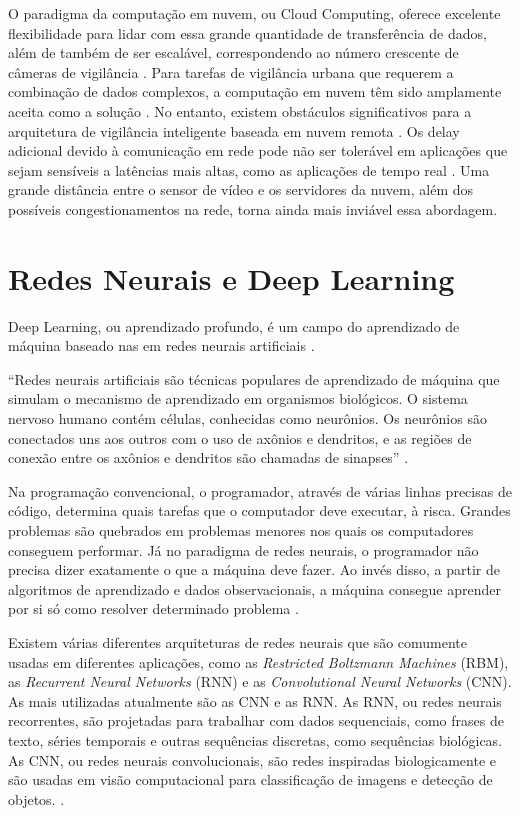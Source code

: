 O paradigma da computação em nuvem, ou Cloud Computing, oferece excelente flexibilidade para lidar com essa grande quantidade de transferência de dados, além de também de ser escalável, correspondendo ao número crescente de câmeras de vigilância \cite{Nikouei2018}. Para tarefas de vigilância urbana que requerem a combinação de dados complexos, a computação em nuvem têm sido amplamente aceita como a solução \cite{Chen2016}. No entanto, existem obstáculos significativos para a arquitetura de vigilância inteligente baseada em nuvem remota \cite{Nikouei2018}. Os delay adicional devido à comunicação em rede pode não ser tolerável em aplicações que sejam sensíveis a latências mais altas, como as aplicações de tempo real \cite{Chen2016}. Uma grande distância entre o sensor de vídeo e os servidores da nuvem, além dos possíveis congestionamentos na rede, torna ainda mais inviável essa abordagem.

\section{Redes Neurais e Deep Learning}
Deep Learning, ou aprendizado profundo, é um campo do aprendizado de máquina baseado nas em redes neurais artificiais \cite{Brownlee2019}.

“Redes neurais artificiais são técnicas populares de aprendizado de máquina que simulam o mecanismo de aprendizado em organismos biológicos. O sistema nervoso humano contém células, conhecidas como neurônios. Os neurônios são conectados uns aos outros com o uso de axônios e dendritos, e as regiões de conexão entre os axônios e dendritos são chamadas de sinapses” \cite{Aggarwal2018}.

Na programação convencional, o programador, através de várias linhas precisas de código, determina quais tarefas que o computador deve executar, à risca. Grandes problemas são quebrados em problemas menores nos quais os computadores conseguem performar. Já no paradigma de redes neurais, o programador não precisa dizer exatamente o que a máquina deve fazer. Ao invés disso, a partir de algoritmos de aprendizado e dados observacionais, a máquina consegue aprender por si só como resolver determinado problema \cite{Neapolitan2018}.

Existem várias diferentes arquiteturas de redes neurais que são comumente usadas em diferentes aplicações, como as \textit{Restricted Boltzmann Machines} (RBM), as \textit{Recurrent Neural Networks} (RNN) e as \textit{Convolutional Neural Networks} (CNN). As mais utilizadas atualmente são as CNN e as RNN. As RNN, ou redes neurais recorrentes, são projetadas para trabalhar com dados sequenciais, como frases de texto, séries temporais e outras sequências discretas, como sequências biológicas. As CNN, ou redes neurais convolucionais, são redes inspiradas biologicamente e são usadas em visão computacional para classificação de imagens e detecção de objetos. \cite{Aggarwal2018}.

